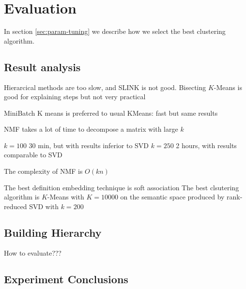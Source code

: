 \section{Evaluation} \label{sec:evaluation}

In section \ref{sec:param-tuning} we describe how we select
the best clustering algorithm.



\subsection{Result analysis}

Hierarcical methods are too slow, and SLINK is not good.
Bisecting $K$-Means is good for explaining steps but not very practical

MiniBatch K means is preferred to usual KMeans:
fast but same results

NMF takes a lot of time to decompose a matrix with large
$k$

 $k=100$ 30 min, but with results inferior to SVD
 $k=250$ 2 hours, with results comparable to SVD

The complexity of NMF is $O(kn)$


The best definition embedding technique is soft association
The best clsutering algorithm is $K$-Means with $K=10000$
on the semantic space produced by rank-reduced SVD with $k = 200$


\subsection{Building Hierarchy}

How to evaluate???


\subsection{Experiment Conclusions}

